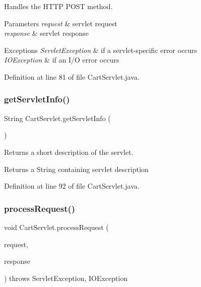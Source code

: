 Handles the H\+T\+TP {\ttfamily P\+O\+ST} method.


\begin{DoxyParams}{Parameters}
{\em request} & servlet request \\
\hline
{\em response} & servlet response \\
\hline
\end{DoxyParams}

\begin{DoxyExceptions}{Exceptions}
{\em Servlet\+Exception} & if a servlet-\/specific error occurs \\
\hline
{\em I\+O\+Exception} & if an I/O error occurs \\
\hline
\end{DoxyExceptions}


Definition at line 81 of file Cart\+Servlet.\+java.

\mbox{\label{class_cart_servlet_a143eb6e94e2ceb49bc82778649257cd4}} 
\subsubsection{\texorpdfstring{getServletInfo()}{getServletInfo()}}
{\footnotesize\ttfamily String Cart\+Servlet.\+get\+Servlet\+Info (\begin{DoxyParamCaption}{ }\end{DoxyParamCaption})}

Returns a short description of the servlet.

\begin{DoxyReturn}{Returns}
a String containing servlet description 
\end{DoxyReturn}


Definition at line 92 of file Cart\+Servlet.\+java.

\mbox{\label{class_cart_servlet_a05df7d4c691e254beda6695575dcb683}} 
\subsubsection{\texorpdfstring{processRequest()}{processRequest()}}
{\footnotesize\ttfamily void Cart\+Servlet.\+process\+Request (\begin{DoxyParamCaption}\item[{Http\+Servlet\+Request}]{request,  }\item[{Http\+Servlet\+Response}]{response }\end{DoxyParamCaption}) throws Servlet\+Exception, I\+O\+Exception\hspace{0.3cm}{\ttfamily [protected]}}

